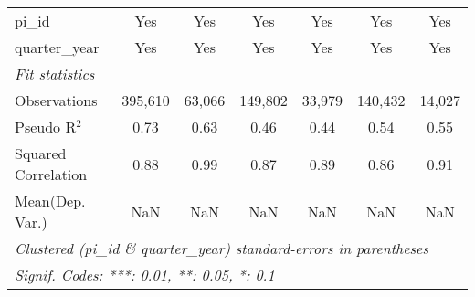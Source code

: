 \begin{tabular}{lcccccc}
   pi\_id                                                     & Yes            & Yes           & Yes           & Yes            & Yes           & Yes\\  
   quarter\_year                                              & Yes            & Yes           & Yes           & Yes            & Yes           & Yes\\  
   \midrule
   \emph{Fit statistics}\\
   Observations                                               & 395,610        & 63,066        & 149,802       & 33,979         & 140,432       & 14,027\\  
   Pseudo R$^2$                                               & 0.73           & 0.63          & 0.46          & 0.44           & 0.54          & 0.55\\  
   Squared Correlation                                        & 0.88           & 0.99          & 0.87          & 0.89           & 0.86          & 0.91\\  
Mean(Dep. Var.) & NaN & NaN & NaN & NaN & NaN & NaN \\
   \midrule \midrule
   \multicolumn{7}{l}{\emph{Clustered (pi\_id \& quarter\_year) standard-errors in parentheses}}\\
   \multicolumn{7}{l}{\emph{Signif. Codes: ***: 0.01, **: 0.05, *: 0.1}}\\
\end{tabular}
\par\endgroup
